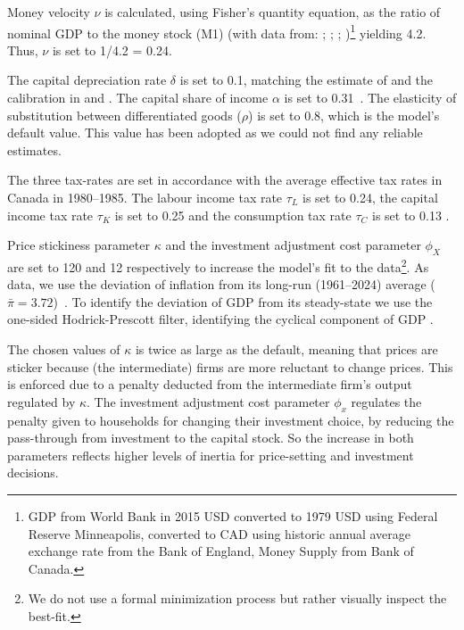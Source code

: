 \documentclass[12pt]{article}
\begin{document}
Money velocity $\nu$ is calculated, using Fisher's quantity equation, as the ratio of nominal GDP to the money stock (M1) (with data from: \textcite{bankofenglandCanadianDollarData2021}; 
\textcite{federalreservebankofminneapolisInflationCalculatorFederal}; \textcite{worldbankgroupWorldBankNational}; \textcite{bankofcanadaSelectedMonetaryAggregates})\footnote{GDP from World Bank in 2015 USD converted to 1979 USD using Federal Reserve Minneapolis, converted to CAD using historic annual average exchange rate from 
the Bank of England, Money Supply from Bank of Canada.} yielding 4.2. Thus, $\nu$ is set to 1/4.2 = 0.24. 

The capital depreciation rate $\delta$ is set to 0.1, matching the estimate of \textcite{statisticscanadaDepreciationRatesProductivity2007} and the calibration in \textcite{someOilDemandSupply2023} and \textcite{corriganToTEMIIIBank2021}.
The capital share of income $\alpha$ is set to 0.31~\parencite{fredst.louisShareLabourCompensation2021,feenstraNextGenerationPenn2015}. The elasticity of substitution between differentiated goods ($\rho$) is set to 0.8, which is the model's default value. This value has been adopted as we could not find any reliable estimates.

The three tax-rates are set in accordance with the average effective tax rates in Canada in 1980--1985. The labour income tax rate $\tau_L$ is set to 0.24, the capital income tax rate $\tau_K$ is set to 0.25 and the consumption tax rate $\tau_C$ is set to 0.13
\parencite{careyAverageEffectiveTax2000}. 

Price stickiness parameter $\kappa$ and the investment adjustment cost parameter $\phi_X$ are set to 120 and 12 respectively to increase the model's fit to the data\footnote{ We do not use a formal minimization process but rather visually inspect the best-fit.}. As data, we use the deviation of inflation from its long-run (1961--2024) average ($\bar{\pi} =  3.72$)~\parencite{worldbank_inflation_ca}. To identify the deviation of GDP from its steady-state we use the one-sided Hodrick-Prescott filter, identifying the cyclical component of GDP \parencite{fred_gdp_per_capita_ca}. 

The chosen values of $\kappa$ is twice as large as the default, meaning that prices are sticker because (the intermediate) firms are more reluctant to change prices. This is enforced due to a penalty deducted from the intermediate firm's output regulated by $\kappa$. The investment adjustment cost parameter $\phi_x$ regulates the penalty given to households for changing their investment choice, by reducing the pass-through from investment to the capital stock. So the increase in both parameters reflects higher levels of inertia for price-setting and investment decisions.
\end{document}
